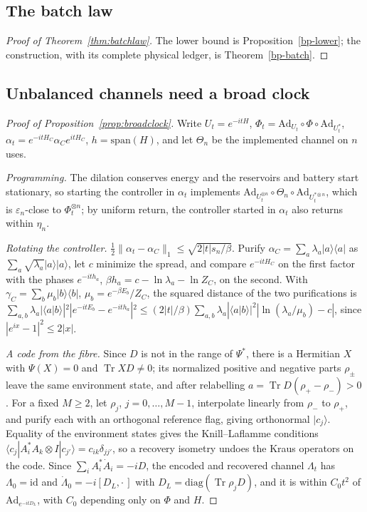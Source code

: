 \documentclass[11pt]{article}
\theoremstyle{definition}
\theoremstyle{remark}
\newcommand{\Tr}{\operatorname{Tr}}
\begin{document}
\subsection{The batch law}\label{pf:batchlaw}

\begin{proof}[Proof of Theorem~\ref{thm:batchlaw}]
The lower bound is Proposition~\ref{bp-lower}; the construction, with its complete physical ledger, is Theorem~\ref{bp-batch}.
\end{proof}

\subsection{Unbalanced channels need a broad clock}\label{pf:broad}

\begin{proof}[Proof of Proposition~\ref{prop:broadclock}]
Write $U_t=e^{-itH}$, $\Phi_t=\mathrm{Ad}_{U_t}\circ\Phi\circ\mathrm{Ad}_{U_t^*}$, $\alpha_t=e^{-itH_C}\alpha_Ce^{itH_C}$, $h=\mathrm{span}(H)$, and let $\Theta_n$ be the implemented channel on $n$ uses.

\emph{Programming.} The dilation conserves energy and the reservoirs and battery start stationary, so starting the controller in $\alpha_t$ implements $\mathrm{Ad}_{U_t^{\otimes n}}\circ\Theta_n\circ\mathrm{Ad}_{U_t^{*\otimes n}}$, which is $\varepsilon_n$-close to $\Phi_t^{\otimes n}$; by uniform return, the controller started in $\alpha_t$ also returns within $\eta_n$.

\emph{Rotating the controller.} $\tfrac12\|\alpha_t-\alpha_C\|_1\le\sqrt{2|t|s_n/\beta}$. Purify $\alpha_C=\sum_a\lambda_a|a\rangle\langle a|$ as $\sum_a\sqrt{\lambda_a}|a\rangle|a\rangle$, let $c$ minimize the spread, and compare $e^{-itH_C}$ on the first factor with the phases $e^{-ith_a}$, $\beta h_a=c-\ln\lambda_a-\ln Z_C$, on the second. With $\gamma_C=\sum_b\mu_b|b\rangle\langle b|$, $\mu_b=e^{-\beta E_b}/Z_C$, the squared distance of the two purifications is $\sum_{a,b}\lambda_a|\langle a|b\rangle|^2|e^{-itE_b}-e^{-ith_a}|^2\le(2|t|/\beta)\sum_{a,b}\lambda_a|\langle a|b\rangle|^2|\ln(\lambda_a/\mu_b)-c|$, since $|e^{ix}-1|^2\le2|x|$.

\emph{A code from the fibre.} Since $D$ is not in the range of $\Psi^*$, there is a Hermitian $X$ with $\Psi(X)=0$ and $\Tr XD\ne0$; its normalized positive and negative parts $\rho_\pm$ leave the same environment state, and after relabelling $a=\Tr D(\rho_+-\rho_-)>0$. For a fixed $M\ge2$, let $\rho_j$, $j=0,\dots,M-1$, interpolate linearly from $\rho_-$ to $\rho_+$, and purify each with an orthogonal reference flag, giving orthonormal $|c_j\rangle$. Equality of the environment states gives the Knill--Laflamme conditions $\langle c_j|A_i^*A_k\otimes I|c_{j'}\rangle=c_{ik}\delta_{jj'}$, so a recovery isometry undoes the Kraus operators on the code. Since $\sum_iA_i^*\dot A_i=-iD$, the encoded and recovered channel $\Lambda_t$ has $\Lambda_0=\mathrm{id}$ and $\dot\Lambda_0=-i[D_L,\cdot\,]$ with $D_L=\mathrm{diag}(\Tr\rho_jD)$, and it is within $C_0t^2$ of $\mathrm{Ad}_{e^{-itD_L}}$, with $C_0$ depending only on $\Phi$ and $H$.


\end{proof}
\end{document}
